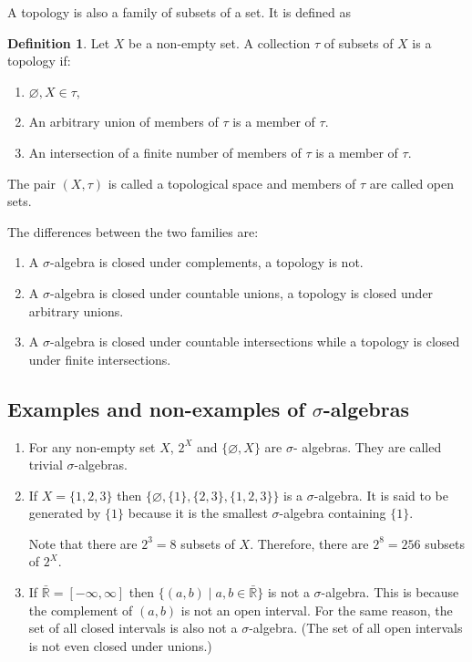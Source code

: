 \documentclass{article}
\newcommand{\sor}{\mathbb{R}}
\theoremstyle{plain}
\numberwithin{thm}{section}
\theoremstyle{plain}
\numberwithin{prop}{section}
\theoremstyle{definition}
\newtheorem{defn}{Definition}
\numberwithin{defn}{section}
\theoremstyle{remark}
\theoremstyle{plain}
\numberwithin{cor}{section}
\numberwithin{equation}{section}
\begin{document}
A topology is also a family of subsets of a set. It is defined as
\begin{defn}\label{s1d3}
Let $X$ be a non-empty set. A collection $\tau$ of subsets of $X$ is a topology
if:
\begin{enumerate}
\item $\varnothing, X \in \tau$,
\item An arbitrary union of members of $\tau$ is a member of $\tau$.
\item An intersection of a finite number of members of $\tau$ is a member of $\tau$.
\end{enumerate}
The pair $(X, \tau)$ is called a topological space and members of $\tau$ are
called open sets.
\end{defn}
The differences between the two families are:
\begin{enumerate}
\item A $\sigma$-algebra is closed under complements, a topology is not.
\item A $\sigma$-algebra is closed under countable unions, a topology is closed
under arbitrary unions.
\item A $\sigma$-algebra is closed under countable intersections while a topology
is closed under finite intersections.
\end{enumerate}

\subsection{Examples and non-examples of $\sigma$-algebras}
\begin{enumerate}
\item For any non-empty set $X$, $2^X$ and $\{\varnothing, X\}$ are $\sigma$-
algebras. They are called trivial $\sigma$-algebras.
\item If $X = \{1, 2, 3\}$ then $\{\varnothing, \{1\}, \{2, 3\}, \{1, 2, 3\}\}$ is
a $\sigma$-algebra. It is said to be generated by $\{1\}$ because it is the 
smallest $\sigma$-algebra containing $\{1\}$. 

Note that there are $2^3 = 8$ subsets of $X$. Therefore, there are $2^8 = 256$
subsets of $2^X$.
\item If $\bar{\sor} = [-\infty, \infty]$ then $\{(a, b)\;|\; a, b\in\bar{\sor}\}$
is not a $\sigma$-algebra. This is because the complement of $(a, b)$ is not an open
interval. For the same reason, the set of all closed intervals is also not a
$\sigma$-algebra. (The set of all open intervals is not even closed under unions.)
\end{enumerate}
\end{document}
